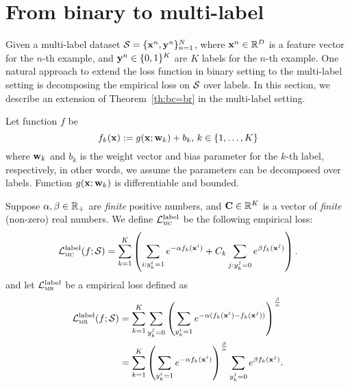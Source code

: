 \section{From binary to multi-label}
\label{sec:ml}

Given a multi-label dataset $\mathcal{S} = \{\mathbf{x}^n, \mathbf{y}^n\}_{n=1}^N$, where $\mathbf{x}^n \in \mathbb{R}^D$ is a feature vector for the $n$-th example,
and $\mathbf{y}^n \in \{0,1\}^K$ are $K$ labels for the $n$-th example.
One natural approach to extend the loss function in binary setting to the multi-label setting is 
decomposing the empirical loss on $\mathcal{S}$ over labels.
In this section, we describe an extension of Theorem~\ref{th:bc=br} in the multi-label setting.

Let function $f$ be
\begin{equation*}
f_k(\mathbf{x}) := g(\mathbf{x}; \mathbf{w}_k) + b_k, \, k \in \{1,\dots,K\}
\end{equation*}
where $\mathbf{w}_k$ and $b_k$ is the weight vector and bias parameter for the $k$-th label, respectively,
in other words, we assume the parameters can be decomposed over labels.
Function $g(\mathbf{x}; \mathbf{w}_k)$ is differentiable and bounded.

Suppose $\alpha, \beta \in \mathbb{R}_+$ are \emph{finite} positive numbers, 
and $\mathbf{C} \in \mathbb{R}^K$ is a vector of \emph{finite} (non-zero) real numbers.
We define $\mathcal{L}_\textsc{mc}^\text{label}$ be the following empirical loss:
\begin{equation}
\label{eq:mc1}
\displaystyle
\mathcal{L}_\textsc{mc}^\text{label}(f; \mathcal{S})
= \sum_{k=1}^K \left(
      \sum_{i: y_k^i = 1} e^{-\alpha f_k(\mathbf{x}^i)} +
  C_k \sum_{j: y_k^j = 0} e^{ \beta  f_k(\mathbf{x}^j)} \right).
\end{equation}
and let $\mathcal{L}_\textsc{mr}^\text{label}$ be a empirical loss defined as
\begin{equation}
\label{eq:mr1}
\begin{aligned}
\displaystyle
\mathcal{L}_\textsc{mr}^\text{label}(f; \mathcal{S})
&= \sum_{k=1}^K
   \sum_{y_k^j = 0} \left( \sum_{y_k^i = 1} e^{-\alpha(f_k(\mathbf{x}^i) - f_k(\mathbf{x}^j))} \right)^\frac{\beta}{\alpha} \\
&= \sum_{k=1}^K \left( 
   \sum_{y_k^i = 1} e^{-\alpha f_k(\mathbf{x}^i)} \right)^\frac{\beta}{\alpha} 
   \sum_{y_k^j = 0} e^{ \beta  f_k(\mathbf{x}^j)}.
\end{aligned}
\end{equation}


